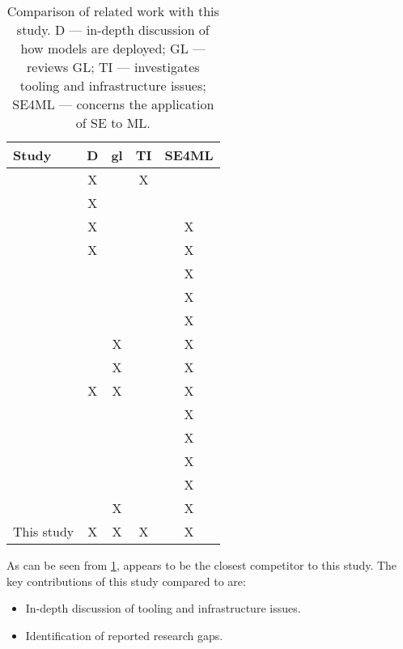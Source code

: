 \begin{table}[h]
    \centering
    \begin{tabular}{l c c c c}
        Study & D & \acrshort{gl} & TI & SE4ML \\
        \hline
        \cite{Shahin2017} & X & & X & \\
        \cite{Rodriguez2017} & X & & & \\
        \cite{Baier2019} & X & & & X \\
        \cite{Paleyes2020} & X & & & X \\
        \cite{Kumeno2020} & & & & X \\
        \cite{Nascimento2020} & & & & X \\
        \cite{Lwakatare2020} & & & & X \\
        \cite{Lwakatare2020a} & & X & & X \\
        \cite{Serban2020} & & X & & X \\
        \cite{John2021} & X & X & & X \\
        \cite{Giray2021} & & & & X \\
        \cite{Lorenzoni2021} & & & & X \\
        \cite{MartinezFernandez2021} & & & & X \\
        \cite{Serban2021} & & & & X \\
        \cite{John2021a} & & X & & X \\
        This study & X & X & X & X \\
    \end{tabular}
    \caption{Comparison of related work with this study. D --- in-depth discussion of how models are deployed; GL --- reviews GL; TI --- investigates tooling and infrastructure issues; SE4ML --- concerns the application of SE to ML.}
    \label{tab:related_work_comparison}
\end{table}

As can be seen from \cref{tab:related_work_comparison}, \cite{John2021} appears to be the closest competitor to this study.
The key contributions of this study compared to \cite{John2021} are:

\begin{itemize}
    \item In-depth discussion of tooling and infrastructure issues.
    \item Identification of reported research gaps.
\end{itemize}